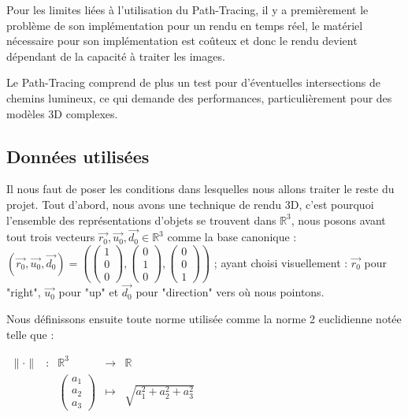 Pour les limites liées à l'utilisation du Path-Tracing, il y a premièrement le problème de son implémentation pour un rendu en temps réel, le matériel nécessaire pour son implémentation est coûteux et donc le rendu devient dépendant de la capacité à traiter les images.

Le Path-Tracing comprend de plus un test pour d'éventuelles intersections de chemins lumineux, ce qui demande des performances, particulièrement pour des modèles 3D complexes.

\subsection{Données utilisées}

Il nous faut de poser les conditions dans lesquelles nous allons traiter le reste du projet. Tout d'abord, nous avons une technique de rendu 3D, c'est pourquoi l'ensemble des représentations d'objets se trouvent dans $\mathbb{R}^3$, nous posons avant tout trois vecteurs $\vec{r_0}, \vec{u_0}, \vec{d_0} \in \mathbb{R}^3$ comme la base canonique : $(\vec{r_0}, \vec{u_0}, \vec{d_0}) =
\left(
\left( \begin{smallmatrix} 1 \\ 0 \\ 0 \end{smallmatrix} \right),
\left( \begin{smallmatrix} 0 \\ 1 \\ 0 \end{smallmatrix} \right),
\left( \begin{smallmatrix} 0 \\ 0 \\ 1 \end{smallmatrix} \right)
\right)$ ; ayant choisi visuellement : $\vec{r_0}$ pour "right", $\vec{u_0}$ pour "up" et $\vec{d_0}$ pour "direction" vers où nous pointons.

Nous définissons ensuite toute norme utilisée comme la norme 2 euclidienne notée telle que :

$\begin{array}{ccccc}
\lVert \cdot \rVert & : & \mathbb{R}^3 & \to & \mathbb{R} \\
 & & \begin{pmatrix} a_1 \\ a_2 \\ a_3 \end{pmatrix} & \mapsto & \sqrt{a_1^2+a_2^2+a_3^2} \end{array}$ \\ \\

